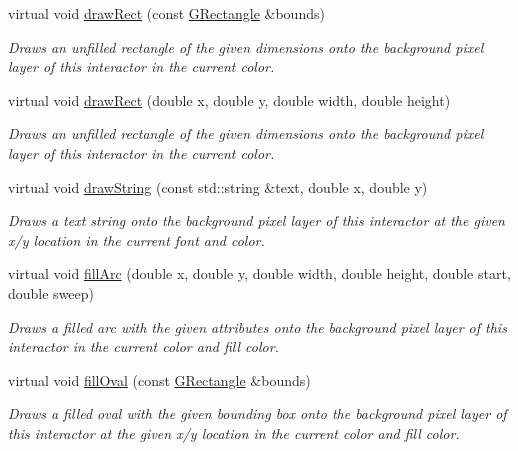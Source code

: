 \begin{DoxyCompactItemize}
virtual void \mbox{\hyperlink{classGDrawingSurface_a3dd4cc5891149dfc36746264f7289877}{draw\+Rect}} (const \mbox{\hyperlink{structGRectangle}{G\+Rectangle}} \&bounds)
\begin{DoxyCompactList}\small\item\em Draws an unfilled rectangle of the given dimensions onto the background pixel layer of this interactor in the current color. \end{DoxyCompactList}\item 
virtual void \mbox{\hyperlink{classGDrawingSurface_a4148e770ffc5474153aadd4814dbd708}{draw\+Rect}} (double x, double y, double width, double height)
\begin{DoxyCompactList}\small\item\em Draws an unfilled rectangle of the given dimensions onto the background pixel layer of this interactor in the current color. \end{DoxyCompactList}\item 
virtual void \mbox{\hyperlink{classGDrawingSurface_ad4e8551a753a77135792bbee97013675}{draw\+String}} (const std\+::string \&text, double x, double y)
\begin{DoxyCompactList}\small\item\em Draws a text string onto the background pixel layer of this interactor at the given x/y location in the current font and color. \end{DoxyCompactList}\item 
virtual void \mbox{\hyperlink{classGDrawingSurface_a228075ad18bd97b57f9956568c4773f3}{fill\+Arc}} (double x, double y, double width, double height, double start, double sweep)
\begin{DoxyCompactList}\small\item\em Draws a filled arc with the given attributes onto the background pixel layer of this interactor in the current color and fill color. \end{DoxyCompactList}\item 
virtual void \mbox{\hyperlink{classGDrawingSurface_a1ea6e48d59fb588797dba4deab1397e0}{fill\+Oval}} (const \mbox{\hyperlink{structGRectangle}{G\+Rectangle}} \&bounds)
\begin{DoxyCompactList}\small\item\em Draws a filled oval with the given bounding box onto the background pixel layer of this interactor at the given x/y location in the current color and fill color. \end{DoxyCompactList}\item 

\end{DoxyCompactItemize}
